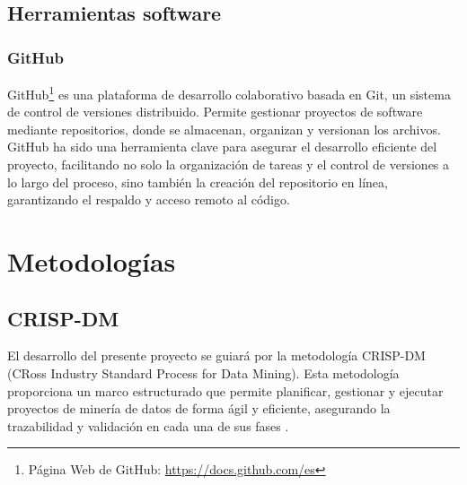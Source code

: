 \subsection{Herramientas software}
\subsubsection{GitHub}
GitHub\footnote{Página Web de GitHub: \url{https://docs.github.com/es}} es una plataforma de desarrollo colaborativo basada en Git, un sistema de control de versiones distribuido. Permite gestionar proyectos de software mediante repositorios, donde se almacenan, organizan y versionan los archivos. GitHub ha sido una herramienta clave para asegurar el desarrollo eficiente del proyecto, facilitando no solo la organización de tareas y el control de versiones a lo largo del proceso, sino también la creación del repositorio en línea, garantizando el respaldo y acceso remoto al código.
\section{Metodologías}
\subsection{CRISP-DM}
El desarrollo del presente proyecto se guiará por la metodología CRISP-DM (CRoss Industry Standard Process for Data Mining). Esta metodología proporciona un marco estructurado que permite planificar, gestionar y ejecutar proyectos de minería de datos de forma ágil y eficiente, asegurando la trazabilidad y validación en cada una de sus fases \cite{crispdm2021}.

